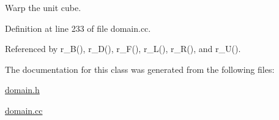Warp the unit cube. 



Definition at line 233 of file domain.\+cc.



Referenced by r\+\_\+\+B(), r\+\_\+\+D(), r\+\_\+\+F(), r\+\_\+\+L(), r\+\_\+\+R(), and r\+\_\+\+U().



The documentation for this class was generated from the following files\+:\begin{DoxyCompactItemize}
\item 
\hyperlink{domain_8h}{domain.\+h}\item 
\hyperlink{domain_8cc}{domain.\+cc}\end{DoxyCompactItemize}
